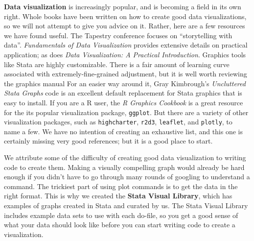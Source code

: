 \textbf{Data visualization} 
is increasingly popular, and is becoming a field in its own right.\cite{healy2018data,wilke2019fundamentals}
Whole books have been written on how to create good data visualizations,
so we will not attempt to give you advice on it.
Rather, here are a few resources we have found useful.
The Tapestry conference focuses on ``storytelling with data''.
\textit{Fundamentals of Data Visualization} provides extensive details on practical application;
as does \textit{Data Visualization: A Practical Introduction}.
Graphics tools like Stata are highly customizable.
There is a fair amount of learning curve associated with extremely-fine-grained adjustment,
but it is well worth reviewing the graphics manual
For an easier way around it, Gray Kimbrough's \textit{Uncluttered Stata Graphs}
code is an excellent default replacement for Stata graphics that is easy to install.
If you are a R user, the \textit{R Graphics Cookbook}
is a great resource for the its popular visualization package, \texttt{ggplot}.
But there are a variety of other visualization packages,
such as \texttt{highcharter},
\texttt{r2d3},
\texttt{leaflet},
and \texttt{plotly}, to name a few.
We have no intention of creating an exhaustive list, and this one is certainly missing very good references; but it is a good place to start.

We attribute some of the difficulty of creating good data visualization
to writing code to create them.
Making a visually compelling graph would already be hard enough if
you didn't have to go through many rounds of googling to understand a command.
The trickiest part of using plot commands is to get the data in the right format.
This is why we created the \textbf{Stata Visual Library},
which has examples of graphs created in Stata and curated by us.
The Stata Visual Library includes example data sets to use with each do-file,
so you get a good sense of what your data should look like
before you can start writing code to create a visualization.

